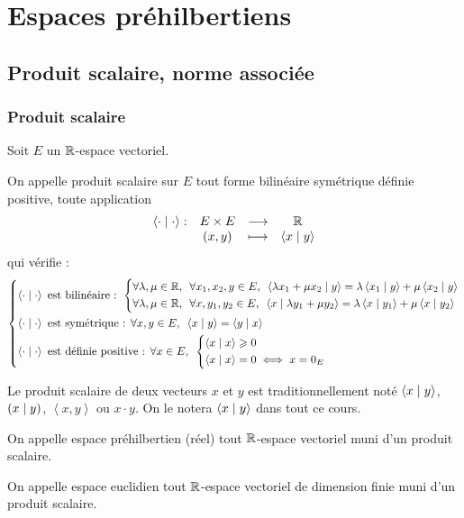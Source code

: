 \chapter{Espaces préhilbertiens}

\minitoc

\section{Produit scalaire, norme associée}

\subsection{Produit scalaire}

\begin{defi}
Soit \(E\) un \(\mathbb{R}\)-espace vectoriel.

On appelle produit scalaire sur \(E\) tout forme bilinéaire symétrique définie positive, \cad toute application \[\begin{array}[t]{cccc}\left\langle\cdot\;\middle|\;\cdot\right\rangle : & E\times E & \longrightarrow & \mathbb{R} \\ & \left(x,y\right) & \longmapsto & \left\langle x\;\middle|\; y\right\rangle\end{array}\] qui vérifie : \[\begin{dcases}
\ps{\cdot}{\cdot}\text{ est bilinéaire : }\begin{dcases}
\quantifs{\forall\lambda,\mu\in\R;\forall x_1,x_2,y\in E}\ps{\lambda x_1+\mu x_2}{y}=\lambda\ps{x_1}{y}+\mu\ps{x_2}{y} \\
\quantifs{\forall\lambda,\mu\in\R;\forall x,y_1,y_2\in E}\ps{x}{\lambda y_1+\mu y_2}=\lambda\ps{x}{y_1}+\mu\ps{x}{y_2}
\end{dcases} \\
\ps{\cdot}{\cdot}\text{ est symétrique : }\quantifs{\forall x,y\in E}\ps{x}{y}=\ps{y}{x} \\
\ps{\cdot}{\cdot}\text{ est définie positive : }\quantifs{\forall x\in E}\begin{dcases}
\ps{x}{x}\geq0 \\
\ps{x}{x}=0\ssi x=0_E
\end{dcases}
\end{dcases}\]

Le produit scalaire de deux vecteurs \(x\) et \(y\) est traditionnellement noté \(\left\langle x\;\middle|\; y\right\rangle\), \(\left(x\;\middle|\; y\right)\), \(\left\langle x,y\right\rangle\) ou \(x\cdot y\). On le notera \(\left\langle x\;\middle|\; y\right\rangle\) dans tout ce cours.
\end{defi}

\begin{defi}
On appelle espace préhilbertien (réel) tout \(\mathbb{R}\)-espace vectoriel muni d'un produit scalaire.

On appelle espace euclidien tout \(\mathbb{R}\)-espace vectoriel de dimension finie muni d'un produit scalaire.
\end{defi}

